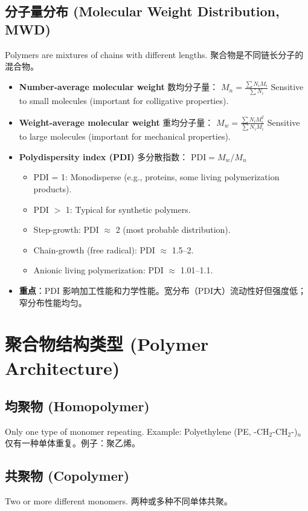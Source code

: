 \documentclass[12pt,a4paper]{ctexart}
\begin{document}
\subsection{分子量分布 (Molecular Weight Distribution, MWD)}
Polymers are mixtures of chains with different lengths. 聚合物是不同链长分子的混合物。

\begin{itemize}
    \item \textbf{Number-average molecular weight} 数均分子量：  
    $M_n = \frac{\sum N_i M_i}{\sum N_i}$  
    Sensitive to small molecules (important for colligative properties).
    
    \item \textbf{Weight-average molecular weight} 重均分子量：  
    $M_w = \frac{\sum N_i M_i^2}{\sum N_i M_i}$  
    Sensitive to large molecules (important for mechanical properties).
    
    \item \textbf{Polydispersity index (PDI)} 多分散指数：  
    $\text{PDI} = M_w / M_n$  
    \begin{itemize}
        \item PDI = 1: Monodisperse (e.g., proteins, some living polymerization products).
        \item PDI $>$ 1: Typical for synthetic polymers.  
        \item Step-growth: PDI $\approx$ 2 (most probable distribution).  
        \item Chain-growth (free radical): PDI $\approx$ 1.5–2.  
        \item Anionic living polymerization: PDI $\approx$ 1.01–1.1.
    \end{itemize}
    \item \textbf{重点}：PDI 影响加工性能和力学性能。宽分布（PDI大）流动性好但强度低；窄分布性能均匀。
\end{itemize}

\section{聚合物结构类型 (Polymer Architecture)}

\subsection{均聚物 (Homopolymer)}
Only one type of monomer repeating. Example: Polyethylene (PE, -CH$_2$-CH$_2$-)$_n$  
仅有一种单体重复。例子：聚乙烯。

\subsection{共聚物 (Copolymer)}
Two or more different monomers. 两种或多种不同单体共聚。
\end{document}

